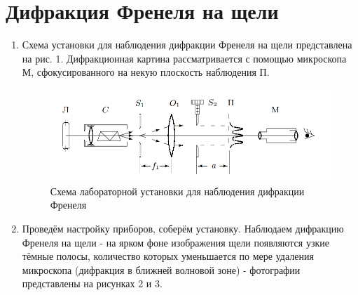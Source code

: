 \documentclass[a4paper]{article}
\begin{document}
\section{Дифракция Френеля на щели}
\begin{enumerate}
    \item Схема установки для наблюдения дифракции Френеля на щели представлена на рис. 1. Дифракционная картина рассматривается с помощью микроскопа М, сфокусированного на некую плоскость наблюдения П. 
\begin{figure}[h]
    \centering
    \includegraphics[width=15cm]{setup_frenel.PNG}
    \caption{Схема лабораторной установки для наблюдения дифракции Френеля}
    \label{fig:vac}
\end{figure}

\item Проведём настройку приборов, соберём установку. Наблюдаем дифракцию Френеля на щели - на ярком фоне изображения щели появляются узкие тёмные полосы, количество которых уменьшается по мере удаления микроскопа (дифракция в ближней волновой зоне) - фотографии представлены на рисунках 2 и 3.


\end{enumerate}
\end{document}
